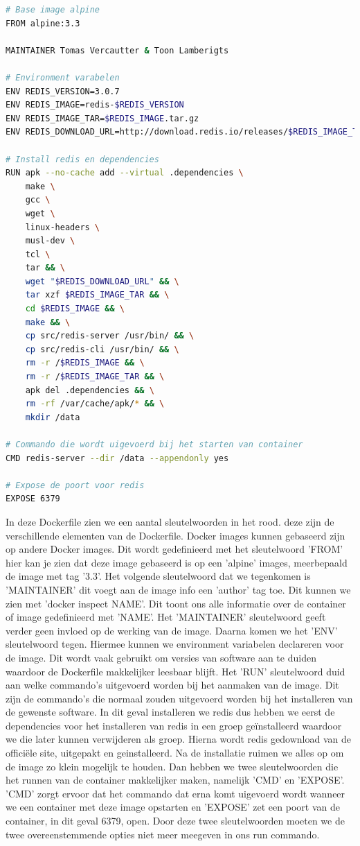\begin{lstlisting}[language=bash, style=configstyle]
# Base image alpine
FROM alpine:3.3

MAINTAINER Tomas Vercautter & Toon Lamberigts

# Environment varabelen
ENV REDIS_VERSION=3.0.7
ENV REDIS_IMAGE=redis-$REDIS_VERSION
ENV REDIS_IMAGE_TAR=$REDIS_IMAGE.tar.gz
ENV REDIS_DOWNLOAD_URL=http://download.redis.io/releases/$REDIS_IMAGE_TAR

# Install redis en dependencies
RUN apk --no-cache add --virtual .dependencies \
    make \
    gcc \
    wget \
    linux-headers \
    musl-dev \
    tcl \
    tar && \
    wget "$REDIS_DOWNLOAD_URL" && \
    tar xzf $REDIS_IMAGE_TAR && \
    cd $REDIS_IMAGE && \
    make && \
    cp src/redis-server /usr/bin/ && \
    cp src/redis-cli /usr/bin/ && \
    rm -r /$REDIS_IMAGE && \
    rm -r /$REDIS_IMAGE_TAR && \
    apk del .dependencies && \
    rm -rf /var/cache/apk/* && \
    mkdir /data

# Commando die wordt uigevoerd bij het starten van container
CMD redis-server --dir /data --appendonly yes

# Expose de poort voor redis
EXPOSE 6379
\end{lstlisting}

In deze Dockerfile zien we een aantal sleutelwoorden in het rood. deze zijn de verschillende elementen van de Dockerfile. Docker images kunnen gebaseerd zijn op andere Docker images. Dit wordt gedefinieerd met het sleutelwoord 'FROM' hier kan je zien dat deze image gebaseerd is op een 'alpine' images, meerbepaald de image met tag '3.3'. Het volgende sleutelwoord dat we tegenkomen is 'MAINTAINER' dit voegt aan de image info een 'author' tag toe. Dit kunnen we zien met 'docker inspect NAME'. Dit toont ons alle informatie over de container of image gedefinieerd met 'NAME'. Het 'MAINTAINER' sleutelwoord geeft verder geen invloed op de werking van de image. Daarna komen we het 'ENV' sleutelwoord tegen. Hiermee kunnen we environment variabelen declareren voor de image. Dit wordt vaak gebruikt om versies van software aan te duiden waardoor de Dockerfile makkelijker leesbaar blijft. Het 'RUN' sleutelwoord duid aan welke commando's uitgevoerd worden bij het aanmaken van de image. Dit zijn de commando's die normaal zouden uitgevoerd worden bij het installeren van de gewenste software. In dit geval installeren we redis dus hebben we eerst de dependencies voor het installeren van redis in een groep geïnstalleerd waardoor we die later kunnen verwijderen als groep. Hierna wordt redis gedownload van de officiële site, uitgepakt en geinstalleerd. Na de installatie ruimen we alles op om de image zo klein mogelijk te houden. Dan hebben we twee sleutelwoorden die het runnen van de container makkelijker maken, namelijk 'CMD' en 'EXPOSE'. 'CMD' zorgt ervoor dat het commando dat erna komt uigevoerd wordt wanneer we een container met deze image opstarten en 'EXPOSE' zet een poort van de container, in dit geval 6379, open. Door deze twee sleutelwoorden moeten we de twee overeenstemmende opties niet meer meegeven in ons run commando.

